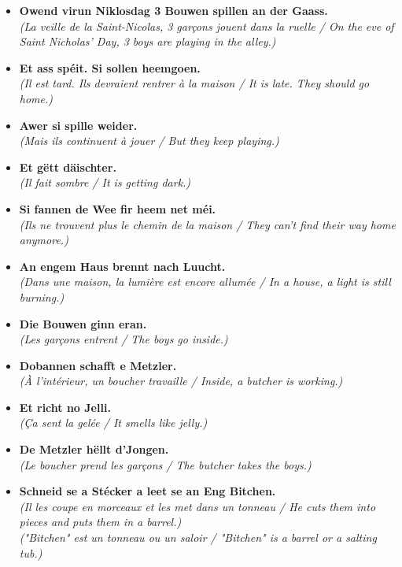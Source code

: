 \begin{itemize}
    \item \textbf{Owend virun Niklosdag 3 Bouwen spillen an der Gaass.} \\
    \textit{(La veille de la Saint-Nicolas, 3 garçons jouent dans la ruelle / On the eve of Saint Nicholas' Day, 3 boys are playing in the alley.)}
    \item \textbf{Et ass spéit. Si sollen heemgoen.} \\
    \textit{(Il est tard. Ils devraient rentrer à la maison / It is late. They should go home.)}
    \item \textbf{Awer si spille weider.} \\
    \textit{(Mais ils continuent à jouer / But they keep playing.)}
    \item \textbf{Et gëtt däischter.} \\
    \textit{(Il fait sombre / It is getting dark.)}
    \item \textbf{Si fannen de Wee fir heem net méi.} \\
    \textit{(Ils ne trouvent plus le chemin de la maison / They can't find their way home anymore.)}
    \item \textbf{An engem Haus brennt nach Luucht.} \\
    \textit{(Dans une maison, la lumière est encore allumée / In a house, a light is still burning.)}
    \item \textbf{Die Bouwen ginn eran.} \\
    \textit{(Les garçons entrent / The boys go inside.)}
    \item \textbf{Dobannen schafft e Metzler.} \\
    \textit{(À l'intérieur, un boucher travaille / Inside, a butcher is working.)}
    \item \textbf{Et richt no Jelli.} \\
    \textit{(Ça sent la gelée / It smells like jelly.)}
    \item \textbf{De Metzler hëllt d’Jongen.} \\
    \textit{(Le boucher prend les garçons / The butcher takes the boys.)}
    \item \textbf{Schneid se a Stécker a leet se an Eng Bitchen.} \\
    \textit{(Il les coupe en morceaux et les met dans un tonneau / He cuts them into pieces and puts them in a barrel.)} \\
    \textit{("Bitchen" est un tonneau ou un saloir / "Bitchen" is a barrel or a salting tub.)}

\end{itemize}

